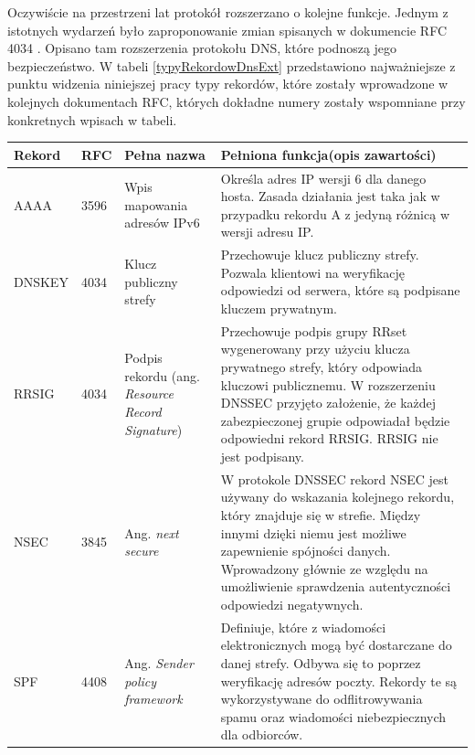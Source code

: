 Oczywiście na przestrzeni lat protokół rozszerzano o kolejne funkcje. Jednym z istotnych wydarzeń było zaproponowanie zmian
spisanych w dokumencie RFC 4034 \cite{RFC4034}. Opisano tam rozszerzenia protokołu DNS, które podnoszą jego bezpieczeństwo.
W tabeli \ref{typyRekordowDnsExt} przedstawiono najważniejsze z punktu widzenia niniejszej pracy typy rekordów, które zostały
wprowadzone w kolejnych dokumentach RFC, których dokładne numery zostały wspomniane przy konkretnych wpisach w tabeli.


\begin{longtable}{|l|p{0.7cm}|p{2.5cm}|p{7.5cm}|}
	\hline
	\textbf{Rekord} &
	\textbf{RFC} &
	\textbf{Pełna nazwa} &
	\textbf{Pełniona funkcja(opis zawartości)} \\ \hline\hline
		AAAA & 3596 \cite{RFC3596} &
		Wpis mapowania adresów IPv6 &
		Określa adres IP wersji 6 dla danego hosta. Zasada działania jest taka jak w przypadku rekordu A z jedyną różnicą
		w wersji adresu IP. \\ \hline

		DNSKEY & 4034 \cite{RFC4034} & Klucz publiczny strefy & Przechowuje klucz publiczny strefy. Pozwala klientowi na
		weryfikację odpowiedzi od serwera,
		które są podpisane kluczem prywatnym. \\ \hline

		RRSIG & 4034 \cite{RFC4034} & Podpis rekordu (ang. \textit{Resource Record Signature}) &
		Przechowuje podpis grupy RRset wygenerowany przy użyciu klucza prywatnego strefy, który odpowiada kluczowi publicznemu. W
		rozszerzeniu DNSSEC przyjęto założenie, że każdej zabezpieczonej grupie odpowiadał będzie odpowiedni rekord RRSIG. RRSIG
		nie jest podpisany.\\ \hline

		NSEC & 3845 \cite{RFC3845} & Ang. \textit{next secure} &
		W protokole DNSSEC rekord NSEC jest używany do wskazania kolejnego rekordu, który znajduje się w strefie. Między innymi
		dzięki niemu jest możliwe zapewnienie spójności danych. Wprowadzony głównie ze względu na umożliwienie sprawdzenia
		autentyczności odpowiedzi negatywnych. \\ \hline

		SPF & 4408 \cite{RFC4408} & Ang. \textit{Sender policy framework} & Definiuje, które z wiadomości elektronicznych mogą być
		dostarczane do danej strefy. Odbywa się to poprzez weryfikację adresów poczty. Rekordy te są wykorzystywane do odflitrowywania
		spamu oraz wiadomości niebezpiecznych dla odbiorców. \\ \hline


\end{longtable}
